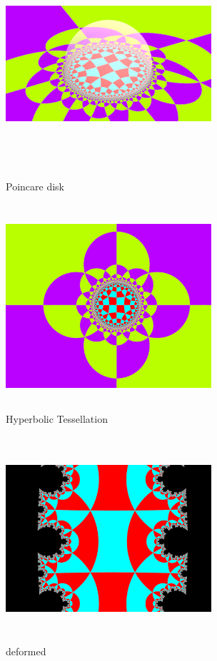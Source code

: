 \begin{figure}[h!tbp]
 \begin{minipage}{0.49\hsize}
   \begin{center}
    \includegraphics[width=3in, height=3in, keepaspectratio]{../img/tessellation/poincare.pdf}
    \caption{Poincare disk}
    \label{fig:poincare}
   \end{center}
 \end{minipage}
 \hspace*{\fill}
 \begin{minipage}{0.49\hsize}
   \begin{center}
    \includegraphics[width=3in, height=3in, keepaspectratio]{../img/tessellation/outer.pdf}
    \caption{Hyperbolic Tessellation}
    \label{fig:outer}
   \end{center}
 \end{minipage}
\end{figure}


\begin{figure}[htbp]
 \begin{center}
      \includegraphics[width=3in, height=3in, keepaspectratio]{../img/tessellation/deformedTessellation.pdf}
    \caption{deformed}
    \label{fig:deformed}
 \end{center}
\end{figure}

\clearpage